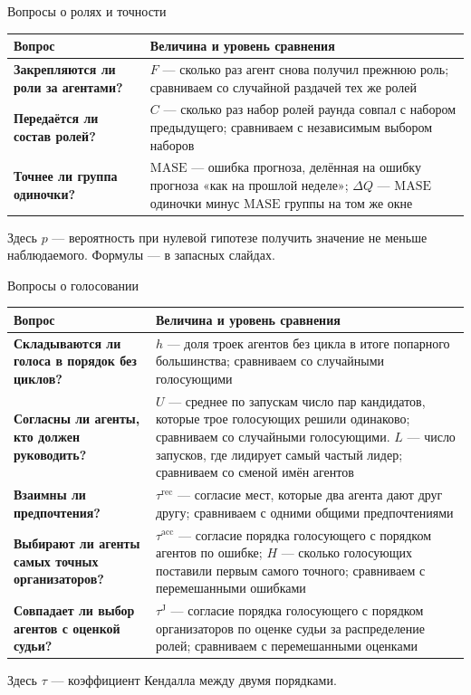 \documentclass[aspectratio=169,11pt]{beamer}
\begin{document}
\begin{frame}{Вопросы о ролях и точности}
\footnotesize
\renewcommand{\arraystretch}{1.5}
\begin{tabular}{@{}p{4.1cm}p{9.3cm}@{}}
\toprule
Вопрос & Величина и уровень сравнения\\
\midrule
\textbf{Закрепляются ли роли за агентами?} & $F$ --- сколько раз агент снова получил прежнюю роль; сравниваем со случайной раздачей тех же ролей\\
\textbf{Передаётся ли состав ролей?} & $C$ --- сколько раз набор ролей раунда совпал с набором предыдущего; сравниваем с независимым выбором наборов\\
\textbf{Точнее ли группа одиночки?} & $\mathrm{MASE}$ --- ошибка прогноза, делённая на ошибку прогноза «как на прошлой неделе»; $\Delta Q$ --- $\mathrm{MASE}$ одиночки минус $\mathrm{MASE}$ группы на том же окне\\
\bottomrule
\end{tabular}

\bigskip
Здесь $p$ --- вероятность при нулевой гипотезе получить значение не меньше наблюдаемого. Формулы --- в запасных слайдах.
\end{frame}

\begin{frame}{Вопросы о голосовании}
\scriptsize
\renewcommand{\arraystretch}{1.3}
\begin{tabular}{@{}p{4.1cm}p{9.3cm}@{}}
\toprule
Вопрос & Величина и уровень сравнения\\
\midrule
\textbf{Складываются ли голоса в порядок без циклов?} & $h$ --- доля троек агентов без цикла в итоге попарного большинства; сравниваем со случайными голосующими\\
\textbf{Согласны ли агенты, кто должен руководить?} & $U$ --- среднее по запускам число пар кандидатов, которые трое голосующих решили одинаково; сравниваем со случайными голосующими. $L$ --- число запусков, где лидирует самый частый лидер; сравниваем со сменой имён агентов\\
\textbf{Взаимны ли предпочтения?} & $\tau^{\mathrm{rec}}$ --- согласие мест, которые два агента дают друг другу; сравниваем с одними общими предпочтениями\\
\textbf{Выбирают ли агенты самых точных организаторов?} & $\tau^{\mathrm{acc}}$ --- согласие порядка голосующего с порядком агентов по ошибке; $H$ --- сколько голосующих поставили первым самого точного; сравниваем с перемешанными ошибками\\
\textbf{Совпадает ли выбор агентов с оценкой судьи?} & $\tau^{\mathrm J}$ --- согласие порядка голосующего с порядком организаторов по оценке судьи за распределение ролей; сравниваем с перемешанными оценками\\
\bottomrule
\end{tabular}

\medskip
Здесь $\tau$ --- коэффициент Кендалла между двумя порядками.
\end{frame}
\end{document}
